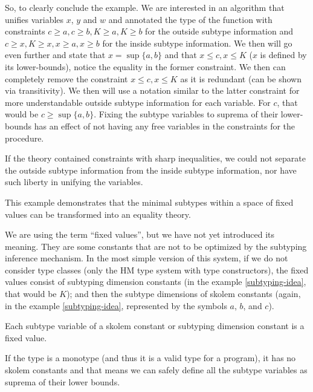 \begin{ex}
So, to clearly conclude the example. We are interested in an algorithm that unifies variables $x$, $y$ and $w$ and annotated the type of the function with constraints $c \geq a, c \geq b, K \geq a, K \geq b$ for the outside subtype information and $c \geq x, K \geq x, x \geq a, x \geq b$ for the inside subtype information. We then will go even further and state that $x = \sup \{a, b\}$ and that $x \leq c, x\leq K$ ($x$ is defined by its lower-bounds), notice the equality in the former constraint. We then can completely remove the constraint $x \leq c, x \leq K$ as it is redundant (can be shown via transitivity).  We then will use a notation similar to the latter constraint for more understandable outside subtype information for each variable. For $c$, that would be $c \geq \sup \{a, b\}$. Fixing the subtype variables to suprema of their lower-bounds has an effect of not having any free variables in the constraints for the procedure.

If the theory contained constraints with sharp inequalities, we could not separate the outside subtype information from the inside subtype information, nor have such liberty in unifying the variables.

This example demonstrates that the minimal subtypes within a space of fixed values can be transformed into an equality theory.

\end{ex}

We are using the term ``fixed values'', but we have not yet introduced its meaning. They are some constants that are not to be optimized by the subtyping inference mechanism. In the most simple version of this system, if we do not consider type classes (only the HM type system with type constructors), the fixed values consist of subtyping dimension constants (in the example \ref{subtyping-idea}, that would be $K$); and then the subtype dimensions of skolem constants (again, in the example \ref{subtyping-idea}, represented by the symbols $a$, $b$, and $c$).

\begin{defn}
    Each subtype variable of a skolem constant or subtyping dimension constant is a fixed value.
\end{defn}

If the type is a monotype (and thus it is a valid type for a program), it has no skolem constants and that means we can safely define all the subtype variables as suprema of their lower bounds.

